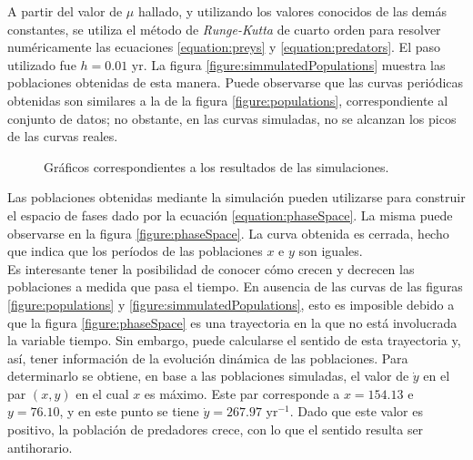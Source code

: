 \documentclass[journal, monochrome]{IEEEtran}
\begin{document}
A partir del valor de $\mu$ hallado, y utilizando los valores conocidos de las demás constantes, se utiliza el método de \textit{Runge-Kutta} de cuarto orden \citep{mathews} para resolver numéricamente las ecuaciones 
\ref{equation:preys} y \ref{equation:predators}. El paso utilizado fue $h = 0.01 \text{ yr}$. La figura \ref{figure:simmulatedPopulations} muestra las poblaciones obtenidas de esta manera. Puede observarse que las curvas periódicas obtenidas 
son similares a la de la figura \ref{figure:populations}, correspondiente al conjunto de datos; no obstante, en las curvas simuladas, no se alcanzan los picos de las curvas reales.\\

\begin{figure}[htbp]
	\centering
	\caption{Gráficos correspondientes a los resultados de las simulaciones.}
\end{figure}

Las poblaciones obtenidas mediante la simulación pueden utilizarse para construir el espacio de fases dado por la ecuación \ref{equation:phaseSpace}. La misma puede observarse en la figura \ref{figure:phaseSpace}. 
La curva obtenida es cerrada, hecho que indica que los períodos de las poblaciones $x$ e $y$ son iguales.\\

Es interesante tener la posibilidad de conocer cómo crecen y decrecen las poblaciones a medida que pasa el tiempo. En ausencia de las curvas de las figuras \ref{figure:populations} y 
\ref{figure:simmulatedPopulations}, esto es imposible debido a que la figura \ref{figure:phaseSpace} es una trayectoria en la que no está involucrada la variable tiempo. Sin embargo, 
puede calcularse el sentido de esta trayectoria y, así, tener información de la evolución dinámica de las poblaciones. Para determinarlo se obtiene, en base a las poblaciones simuladas, 
el valor de $\dot{y}$ en el par $(x, y)$ en el cual $x$ es máximo. Este par corresponde a $x = 154.13$ e $y = 76.10$, y en este punto se tiene $\dot{y} = 267.97 \text{ yr}^{-1}$. Dado que este valor es positivo,
la población de predadores crece, con lo que el sentido resulta ser antihorario.
\end{document}
